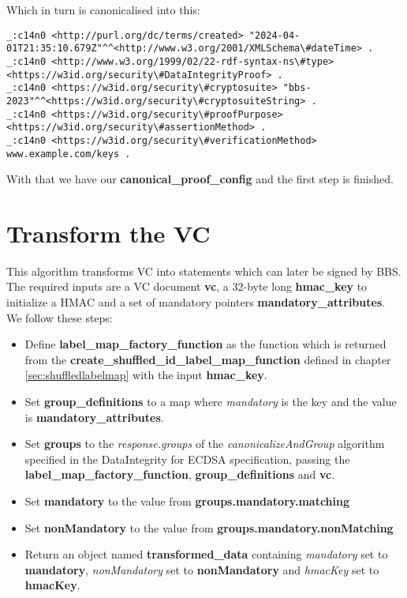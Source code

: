 \documentclass[
	a4paper               %
	,bibliography=totoc   %
	,listof=totoc         %
	,monolingual
]{bfhthesis}              %
\begin{document}
Which in turn is canonicalised into this:

\begin{lstlisting}[language=canon,firstnumber=1,caption={Example Proof Config canonicalized},captionpos=b]
_:c14n0 <http://purl.org/dc/terms/created> "2024-04-01T21:35:10.679Z"^^<http://www.w3.org/2001/XMLSchema\#dateTime> .
_:c14n0 <http://www.w3.org/1999/02/22-rdf-syntax-ns\#type> <https://w3id.org/security\#DataIntegrityProof> .
_:c14n0 <https://w3id.org/security\#cryptosuite> "bbs-2023"^^<https://w3id.org/security\#cryptosuiteString> .
_:c14n0 <https://w3id.org/security\#proofPurpose> <https://w3id.org/security\#assertionMethod> .
_:c14n0 <https://w3id.org/security\#verificationMethod> www.example.com/keys .
\end{lstlisting}

With that we have our \textbf{canonical\_proof\_config} and the first step is finished.

\section{Transform the VC}
\label{chap:transform}
This algorithm transforms VC into statements which can later be signed by BBS.\\

The required inputs are a VC document \textbf{vc}, a 32-byte long \textbf{hmac\_key} to initialize a HMAC and a set of mandatory pointers \textbf{mandatory\_attributes}.\\

We follow these steps:
\begin{itemize}
	\item Define \textbf{label\_map\_factory\_function} as the function which is returned from the \textbf{create\_shuffled\_id\_label\_map\_function} defined in chapter \ref{sec:shuffledlabelmap} with the input \textbf{hmac\_key}.
	\item Set \textbf{group\_definitions} to a map where \textit{mandatory} is the key and the value is \textbf{mandatory\_attributes}.
	\item Set \textbf{groups} to the \textit{response.groups} of the \textit{canonicalizeAndGroup} algorithm specified in the DataIntegrity for ECDSA specification\cite{ecdsa}, passing the \textbf{label\_map\_factory\_function}, \textbf{group\_definitions} and \textbf{vc}.
	\item Set \textbf{mandatory} to the value from \textbf{groups.mandatory.matching}
	\item Set \textbf{nonMandatory} to the value from \textbf{groups.mandatory.nonMatching}
	\item Return an object named \textbf{transformed\_data} containing \textit{mandatory} set to \textbf{mandatory}, \textit{nonMandatory} set to \textbf{nonMandatory} and \textit{hmacKey} set to \textbf{hmacKey}.
\end{itemize}\newpage
\end{document}
